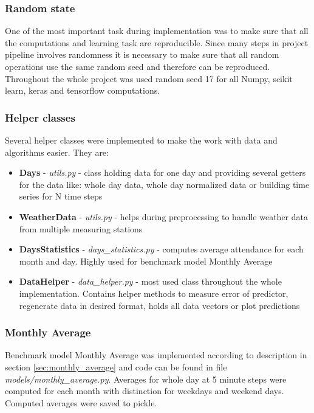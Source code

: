 \documentclass{article}
\begin{document}
\subsubsection{Random state}
One of the most important task during implementation was to make sure that all the computations and learning task are reproducible. Since many steps in project pipeline involves randomness it is necessary to make sure that all random operations use the same random seed and therefore can be reproduced. Throughout the whole project was used random seed 17 for all Numpy, scikit learn, keras and tensorflow computations.

\subsubsection{Helper classes}
Several helper classes were implemented to make the work with data and algorithms easier. They are:
\begin{itemize}
    \item \textbf{Days} - \emph{utils.py} - class holding data for one day and providing several getters for the data like: whole day data, whole day normalized data or building time series for N time steps	        	\item \textbf{WeatherData} - \emph{utils.py} - helps during preprocessing to handle weather data from multiple measuring stations
    \item \textbf{DaysStatistics} - \emph{days\_statistics.py} - computes average attendance for each month and day. Highly used for benchmark model Monthly Average
    \item \textbf{DataHelper} - \emph{data\_helper.py} - most used class throughout the whole implementation. Contains helper methods to measure error of predictor, regenerate data in desired format, holds all data vectors or plot predictions
\end{itemize}

\subsubsection{Monthly Average}
Benchmark model Monthly Average was implemented according to description in section \ref{sec:monthly_average} and code can be found in file \emph{models/monthly\_average.py}. Averages for whole day at 5 minute steps were computed for each month with distinction for weekdays and weekend days. Computed averages were saved to pickle.
 
\end{document}
